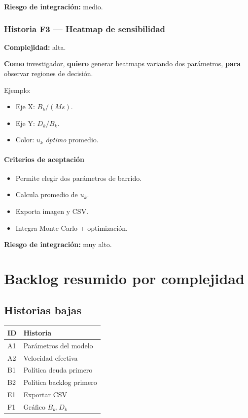 \documentclass[11pt,a4paper]{article}
\begin{document}
\textbf{Riesgo de integraci\'on:} medio.

\subsubsection{Historia F3 --- Heatmap de sensibilidad}

\textbf{Complejidad:} alta.

\textbf{Como} investigador, \textbf{quiero} generar heatmaps variando dos par\'ametros, \textbf{para} observar regiones de decisi\'on.

Ejemplo:

\begin{itemize}[leftmargin=*]
    \item Eje X: $B_k/(M s)$.
    \item Eje Y: $D_k/B_k$.
    \item Color: $u_k$ \textit{\'optimo} promedio.
\end{itemize}

\paragraph{Criterios de aceptaci\'on}

\begin{itemize}[leftmargin=*]
    \item Permite elegir dos par\'ametros de barrido.
    \item Calcula promedio de $u_k$.
    \item Exporta imagen y CSV.
    \item Integra Monte Carlo + optimizaci\'on.
\end{itemize}

\textbf{Riesgo de integraci\'on:} muy alto.

\section{Backlog resumido por complejidad}

\subsection{Historias bajas}

\begin{table}[h!]
\centering
\begin{tabular}{ll}
\toprule
\textbf{ID} & \textbf{Historia} \\
\midrule
A1 & Par\'ametros del modelo \\
A2 & Velocidad efectiva \\
B1 & Pol\'itica deuda primero \\
B2 & Pol\'itica backlog primero \\
E1 & Exportar CSV \\
F1 & Gr\'afico $B_k,D_k$ \\
\bottomrule
\end{tabular}
\end{table}
\end{document}
